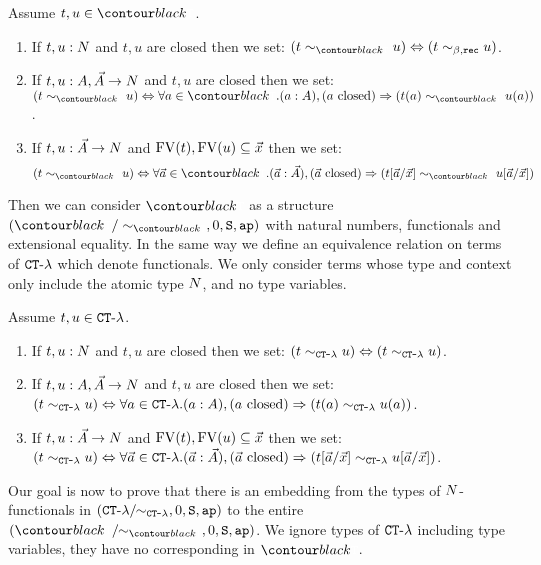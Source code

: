 \begin{definition}
Assume $t,u \in \systemT$.
\begin{enumerate}
\item
If $t,u:{N}$ and $t,u$ are closed then we set: 
$(t \sim_{\systemT} u) \Leftrightarrow  (t \sim_{\beta,\rec} u)$.
\item
If $t,u:A,\vec{A}\rightarrow{N}$ and $t,u$ are closed then we set: 
$(t \sim_{\systemT} u) \Leftrightarrow  
\forall a \in \systemT. (a:A), (\mbox{$a$ closed}) \Rightarrow (t(a) \sim_{\systemT} u(a))$.
\item
If $t,u:\vec{A}\rightarrow{N}$ and ${{\rm FV}}(t), {{\rm FV}}(u) \subseteq \vec{x}$ then we set:
$$
(t \sim_{\systemT} u) 
\Leftrightarrow  
\forall \vec{a} \in \systemT. 
(\vec{a}:\vec{A}), (\mbox{$\vec{a}$ closed})  
\Rightarrow 
(t[\vec{a}/\vec{x}] \sim_{\systemT} u[\vec{a}/\vec{x}])
$$
\end{enumerate}
\end{definition}

Then we can consider $\systemT$ as a structure $(\systemT/\sim_{\systemT}, 0, \Succ, \ap)$
with natural numbers, functionals and extensional equality. 
In the same way we define an equivalence relation on terms of ${ {\tt CT} \mbox{-} \lambda}$ which denote functionals.
We only consider terms whose type and context only include the atomic type ${N}$, and no type variables. 


\begin{definition}
Assume $t,u \in { {\tt CT} \mbox{-} \lambda}$.
\begin{enumerate}
\item
If $t,u:{N}$ and $t,u$ are closed then we set: 
$(t \sim_{{ {\tt CT} \mbox{-} \lambda}} u) \Leftrightarrow  (t \sim_{{ {\tt CT} \mbox{-} \lambda}} u)$.
\item
If $t,u:A,\vec{A}\rightarrow{N}$ and $t,u$ are closed then we set: 
$(t \sim_{{ {\tt CT} \mbox{-} \lambda}} u) \Leftrightarrow  
\forall a \in { {\tt CT} \mbox{-} \lambda}. (a:A), (\mbox{$a$ closed}) \Rightarrow (t(a) \sim_{{ {\tt CT} \mbox{-} \lambda}} u(a))$.
\item
If $t,u:\vec{A}\rightarrow{N}$ and ${{\rm FV}}(t), {{\rm FV}}(u) \subseteq \vec{x}$ then we set:
$(t \sim_{{ {\tt CT} \mbox{-} \lambda}} u) 
\Leftrightarrow  
\forall \vec{a} \in { {\tt CT} \mbox{-} \lambda}. 
(\vec{a}:\vec{A}), (\mbox{$\vec{a}$ closed})  \Rightarrow (t[\vec{a}/\vec{x}] \sim_{{ {\tt CT} \mbox{-} \lambda}} u[\vec{a}/\vec{x}])$.
\end{enumerate}
\end{definition}

Our goal is now to prove that there is an embedding from the types of ${N}$-functionals in 
$({ {\tt CT} \mbox{-} \lambda}/ \!\! \sim_{{ {\tt CT} \mbox{-} \lambda}}, 0, {\tt S}, {\tt ap})$ to the entire
$(\systemT/ \!\! \sim_{\systemT}, 0, \Succ, \ap)$.
We ignore types of ${ {\tt CT} \mbox{-} \lambda}$ including type variables, they have no corresponding in $\systemT$.

